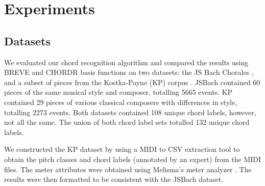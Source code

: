 \documentclass{article} %
\begin{document}
%
%
%
%
%
%
%
%
%
%
%
%
%
%
%
%

\newpage

\section{Experiments}

\subsection{Datasets}

We evaluated our chord recognition algorithm and compared the results using BREVE and CHORDR basis functions on two datasets: the JS Bach Chorales \cite{coral}, and a subset of pieces from the Kostka-Payne (KP) corpus \cite{kpcorpus}. JSBach contained 60 pieces of the same musical style and composer, totalling 5665 events. KP contained 29 pieces of various classical composers with differences in style, totalling 2273 events. Both datasets contained 108 unique chord labels, however, not all the same. The union of both chord label sets totalled 132 unique chord labels.

We constructed the KP dataset by using a MIDI to CSV extraction tool \cite{midicsv} to obtain the pitch classes and chord labels (annotated by an expert) from the MIDI files. The meter attributes were obtained using Melisma’s meter analyzer \cite{mitpress}. The results were then formatted to be consistent with the JSBach dataset.
\end{document}
